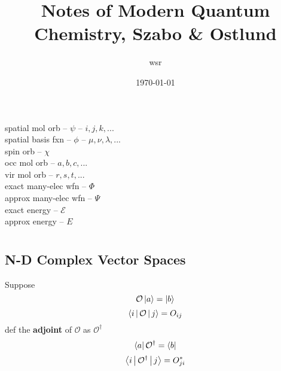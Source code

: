\documentclass[a4paper]{article}
\title{Notes of \textbf{Modern Quantum Chemistry, Szabo \& Ostlund}}
\author{wsr}
\date{\today} %
\numberwithin{equation}{section}
\begin{document}
\maketitle

\tableofcontents

\newpage

\setcounter{section}{-1}
\section{}
spatial mol orb -- $ \psi $ -- $ i,j,k,... $\\
spatial basis fxn -- $ \phi $ -- $ \mu,\nu,\lambda,... $\\
spin orb -- $ \chi $\\
occ mol orb -- $ a,b,c,... $\\
vir mol orb -- $ r,s,t,... $\\
exact many-elec wfn -- $ \Phi $\\
approx many-elec wfn -- $ \Psi $\\
exact energy -- $ \mathscr{E} $\\
approx energy -- $ E $

\section{}
\subsection{}
\subsection{}
\subsection{}
\subsection{N-D Complex Vector Spaces}
Suppose
\begin{equation}\label{key}
\mathcal{O}\ket{a} = \ket{b}
\end{equation}
\begin{equation}\label{key}
\Braket{i | \mathcal{O} | j} = O_{ij}
\end{equation}
def the \textbf{adjoint} of $ \mathcal{O} $ as $ \mathcal{O}^\dagger $
\begin{equation}\label{key}
\bra{a}\mathcal{O}^\dagger = \bra{b}
\end{equation}
\begin{equation}\label{key}
\Braket{i | \mathcal{O}^\dagger | j} = O_{ji}^*
\end{equation}
\end{document}
